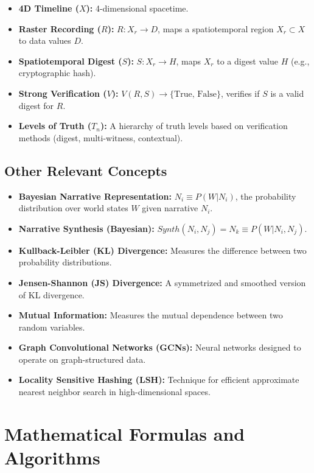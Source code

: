 \documentclass{article}
\begin{document}
\begin{itemize}
    \item \textbf{4D Timeline ($X$): } 4-dimensional spacetime.
    \item \textbf{Raster Recording ($R$): } $R: X_r \to D$, maps a spatiotemporal region $X_r \subset X$ to data values $D$.
    \item \textbf{Spatiotemporal Digest ($S$): } $S: X_r \to H$, maps $X_r$ to a digest value $H$ (e.g., cryptographic hash).
    \item \textbf{Strong Verification ($V$): } $V(R, S) \to \{\text{True, False}\}$, verifies if $S$ is a valid digest for $R$.
    \item \textbf{Levels of Truth ($T_n$): } A hierarchy of truth levels based on verification methods (digest, multi-witness, contextual).
\end{itemize}

\subsection{Other Relevant Concepts}

\begin{itemize}
    \item \textbf{Bayesian Narrative Representation:} $N_i \equiv P(W|N_i)$, the probability distribution over world states $W$ given narrative $N_i$.
    \item \textbf{Narrative Synthesis (Bayesian): } $Synth(N_i, N_j) = N_k \equiv P(W|N_i, N_j)$.
    \item \textbf{Kullback-Leibler (KL) Divergence:} Measures the difference between two probability distributions.
    \item \textbf{Jensen-Shannon (JS) Divergence:}  A symmetrized and smoothed version of KL divergence.
    \item \textbf{Mutual Information:} Measures the mutual dependence between two random variables.
    \item \textbf{Graph Convolutional Networks (GCNs): } Neural networks designed to operate on graph-structured data.
    \item \textbf{Locality Sensitive Hashing (LSH): }  Technique for efficient approximate nearest neighbor search in high-dimensional spaces.
\end{itemize}


\section{Mathematical Formulas and Algorithms}
\end{document}
